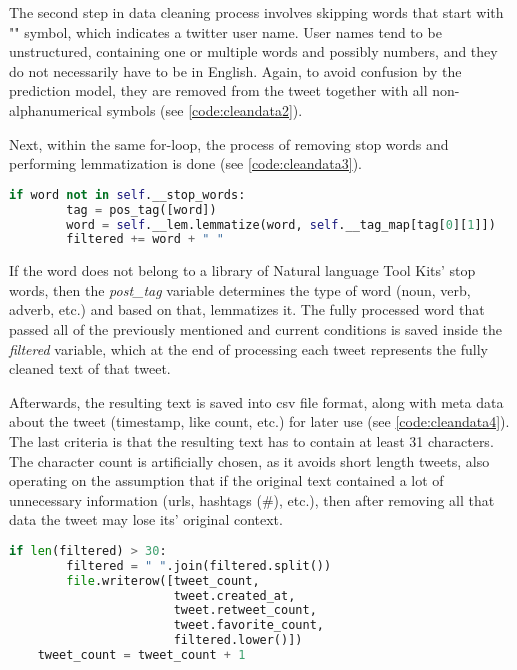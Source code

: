             The second step in data cleaning process involves skipping words that start with "\@" symbol, which indicates a twitter user name. User names tend to be unstructured, containing one or multiple words and possibly numbers, and they do not necessarily have to be in English. Again, to avoid confusion by the prediction model, they are removed from the tweet together with all non-alphanumerical symbols (see \cref{code:cleandata2}).
            
            Next, within the same for-loop, the process of removing stop words and performing lemmatization is done (see \cref{code:cleandata3}).
            
            \begin{lstlisting}[language=Python, caption=Cleaning of Data (Part 3), label=code:cleandata3]
    if word not in self.__stop_words:
        tag = pos_tag([word])
        word = self.__lem.lemmatize(word, self.__tag_map[tag[0][1]])
        filtered += word + " "
            \end{lstlisting}
            \FloatBarrier
            
            If the word does not belong to a library of Natural language Tool Kits' stop words, then the \textit{post\_tag} variable determines the type of word (noun, verb, adverb, etc.) and based on that, lemmatizes it. The fully processed word that passed all of the previously mentioned and current conditions is saved inside the \textit{filtered} variable, which at the end of processing each tweet represents the fully cleaned text of that tweet.
            
            Afterwards, the resulting text is saved into \gls{csv} file format, along with meta data about the tweet (timestamp, like count, etc.) for later use (see \cref{code:cleandata4}). The last criteria is that the resulting text has to contain at least 31 characters. The character count is artificially chosen, as it avoids short length tweets, also operating on the assumption that if the original text contained a lot of unnecessary information (\gls{url}s, hashtags (\#), etc.), then after removing all that data the tweet may lose its' original context. 
            
            \begin{lstlisting}[language=Python, caption=Cleaning of Data (Part 4), label=code:cleandata4]
    if len(filtered) > 30:
        filtered = " ".join(filtered.split())
        file.writerow([tweet_count,
                       tweet.created_at,
                       tweet.retweet_count,
                       tweet.favorite_count,
                       filtered.lower()])
    tweet_count = tweet_count + 1
            \end{lstlisting}
            \FloatBarrier
            
